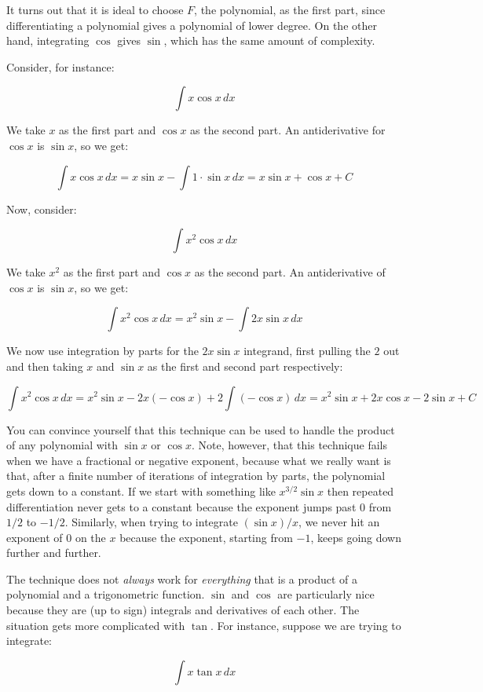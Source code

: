\documentclass{amsart}
\begin{document}
It turns out that it is ideal to choose $F$, the polynomial, as the
first part, since differentiating a polynomial gives a polynomial of
lower degree. On the other hand, integrating $\cos$ gives $\sin$,
which has the same amount of complexity.

Consider, for instance:

$$\int x \cos x \, dx$$

We take $x$ as the first part and $\cos x$ as the second part. An
antiderivative for $\cos x$ is $\sin x$, so we get:

$$\int x \cos x \, dx = x \sin x - \int 1 \cdot \sin x \, dx = x\sin x + \cos x + C$$

Now, consider:

$$\int x^2 \cos x \, dx$$

We take $x^2$ as the first part and $\cos x$ as the second part. An
antiderivative of $\cos x$ is $\sin x$, so we get:

$$\int x^2 \cos x \, dx= x^2 \sin x - \int 2x \sin x \, dx$$

We now use integration by parts for the $2x \sin x$ integrand, first
pulling the $2$ out and then taking $x$ and $\sin x$ as the first and
second part respectively:

$$\int x^2 \cos x \, dx= x^2 \sin x - 2x(-\cos x) + 2 \int (- \cos x) \, dx = x^2 \sin x + 2x \cos x -2 \sin x + C$$

You can convince yourself that this technique can be used to handle
the product of any polynomial with $\sin x$ or $\cos x$. Note,
however, that this technique fails when we have a fractional or
negative exponent, because what we really want is that, after a finite
number of iterations of integration by parts, the polynomial gets down
to a constant. If we start with something like $x^{3/2} \sin x$ then
repeated differentiation never gets to a constant because the exponent
jumps past $0$ from $1/2$ to $-1/2$. Similarly, when trying to
integrate $(\sin x)/x$, we never hit an exponent of $0$ on the $x$
because the exponent, starting from $-1$, keeps going down further and
further.

The technique does not {\em always} work for {\em everything} that is
a product of a polynomial and a trigonometric function. $\sin$ and
$\cos$ are particularly nice because they are (up to sign) integrals
and derivatives of each other. The situation gets more complicated
with $\tan$. For instance, suppose we are trying to integrate:

$$\int x \tan x \, dx$$
\end{document}

